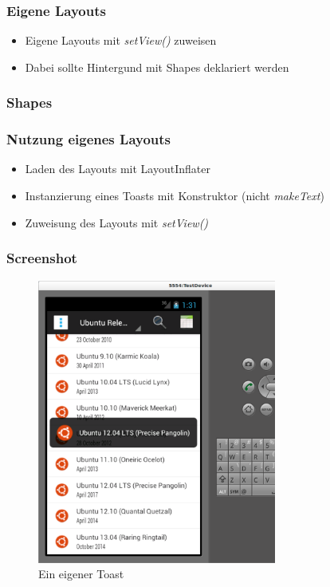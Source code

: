 \begin{frame}
   \frametitle{Eigene Layouts}
   \begin{itemize}
      \item Eigene Layouts mit \emph{setView()} zuweisen
      \item Dabei sollte Hintergund mit Shapes deklariert werden
   \end{itemize}

   
\end{frame}

\begin{frame}
   \frametitle{Shapes}
   
\end{frame}

\begin{frame}
   \frametitle{Nutzung eigenes Layouts}
   \begin{itemize}
      \item Laden des Layouts mit LayoutInflater
      \item Instanzierung eines Toasts mit Konstruktor (nicht \emph{makeText})
      \item Zuweisung des Layouts mit \emph{setView()}
   \end{itemize}

   
\end{frame}

\begin{frame}
   \frametitle{Screenshot}
   \begin{figure}[h!]
     \centering
     \includegraphics[width=0.7\textwidth]{pictures/custom_toast.ps}
     \caption{
        Ein eigener Toast
     }
     \label{fig:custom_toast}
   \end{figure}
\end{frame}


